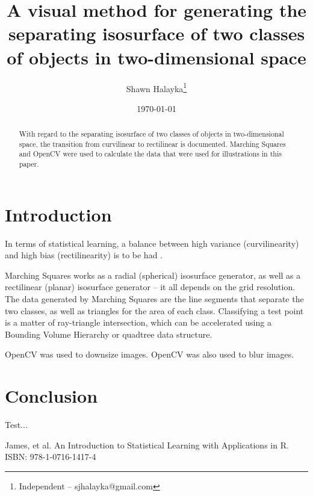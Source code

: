 \documentclass[12pt]{article}
\title{A visual method for generating the separating isosurface of two classes of objects in two-dimensional space}
\author{
Shawn Halayka\footnote{Independent -- sjhalayka@gmail.com}
}
\date{\today\;\currenttime}
\begin{document}
\maketitle

\begin{abstract}
With regard to the separating isosurface of two classes of objects in two-dimensional space, the transition from curvilinear to rectilinear is documented.
Marching Squares and OpenCV were used to calculate the data that were used for illustrations in this paper.
\end{abstract}




\section{Introduction}

In terms of statistical learning, a balance between high variance (curvilinearity) and high bias (rectilinearity) is to be had \cite{james}.

Marching Squares works as a radial (spherical) isosurface generator, as well as a rectilinear (planar) isosurface generator -- it all depends on the grid resolution.
The data generated by Marching Squares are the line segments that separate the two classes, as well as triangles for the area of each class.
Classifying a test point is a matter of ray-triangle intersection, which can be accelerated using a Bounding Volume Hierarchy or quadtree data structure.

OpenCV was used to downsize images.
OpenCV was also used to blur images.


\section{Conclusion}

Test...



\pagebreak


\begin{thebibliography}{9}

 James, et al. An Introduction to Statistical Learning with Applications in R. ISBN: 978-1-0716-1417-4

\end{thebibliography}



\pagebreak
\end{document}
